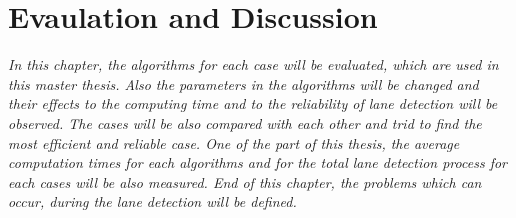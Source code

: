 %
\chapter{Evaulation and Discussion}
\label{cha:Evaulation and Discussion}

\emph{\color{blue}In this chapter, the algorithms for each case will be evaluated, which are used in this master thesis. Also the parameters in the algorithms will be changed and their effects to the computing time and to the reliability of lane detection will be observed. The cases will be also compared with each other and trid to find the most efficient and reliable case. One of the part of this thesis, the average computation times for each algorithms and for the total lane detection process for each cases will be also measured. End of this chapter, the problems which can occur, during the lane detection will be defined.}
%

